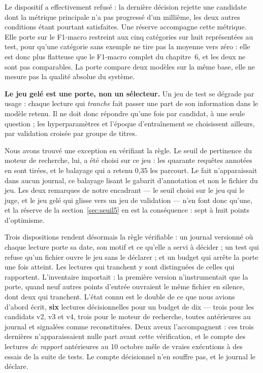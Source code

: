 Le dispositif a effectivement refusé : la dernière décision rejette une candidate dont la métrique
principale n'a pas progressé d'un millième, les deux autres conditions étant pourtant satisfaites.
Une réserve accompagne cette métrique. Elle porte sur le F1-macro restreint aux cinq catégories sur
huit représentées au test, pour qu'une catégorie sans exemple ne tire pas la moyenne vers zéro :
elle est donc plus flatteuse que le F1-macro complet du chapitre~6, et les deux ne sont pas
comparables. La porte compare deux modèles sur la même base, elle ne mesure pas la qualité absolue
du système.

\textbf{Le jeu gelé est une porte, non un sélecteur.} Un jeu de test se dégrade par usage : chaque
lecture qui \emph{tranche} fait passer une part de son information dans le modèle retenu. Il ne doit
donc répondre qu'une fois par candidat, à une seule question ; les hyperparamètres et l'époque
d'entraînement se choisissent ailleurs, par validation croisée par groupe de titres.

Nous avons trouvé une exception en vérifiant la règle. Le seuil de pertinence du moteur de
recherche, lui, a été choisi sur ce jeu : les quarante requêtes annotées en sont tirées, et le
balayage qui a retenu 0,35 les parcourt. Le fait n'apparaissait dans aucun journal, ce balayage
lisant le gabarit d'annotation et non le fichier du jeu. Les deux remarques de notre encadrant — le
seuil choisi sur le jeu qui le juge, et le jeu gelé qui glisse vers un jeu de validation — n'en font
donc qu'une, et la réserve de la section~\ref{sec:seuil5} en est la conséquence : sept à huit points
d'optimisme.

Trois dispositions rendent désormais la règle vérifiable : un journal versionné où chaque lecture
porte sa date, son motif et ce qu'elle a servi à décider ; un test qui refuse qu'un fichier ouvre le
jeu sans le déclarer ; et un budget qui arrête la porte une fois atteint. Les lectures qui tranchent
y sont distinguées de celles qui rapportent. L'inventaire importait : la première version
n'instrumentait que la porte, quand neuf autres points d'entrée ouvraient le même fichier en
silence, dont deux qui tranchent. L'état connu est le double de ce que nous avions d'abord écrit,
\textbf{six} lectures décisionnelles pour un budget de dix — trois pour les candidats v2, v3 et v4,
trois pour le moteur de recherche, toutes antérieures au journal et signalées comme reconstituées.
Deux aveux l'accompagnent : ces trois dernières n'apparaissaient nulle part avant cette
vérification, et le compte des lectures \emph{de rapport} antérieures au 10 octobre mêle de vraies
exécutions à des essais de la suite de tests. Le compte décisionnel n'en souffre pas, et le journal
le déclare.

